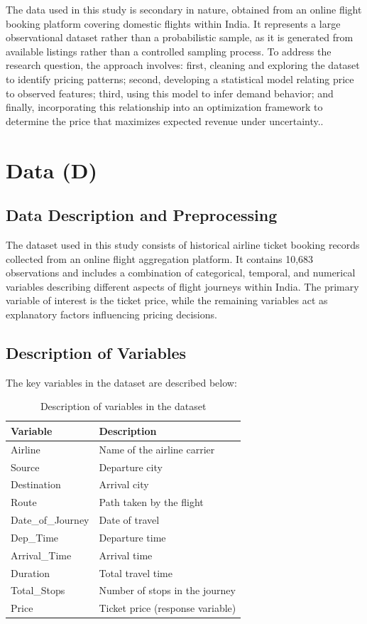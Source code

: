 \documentclass[12pt]{article}
\begin{document}
The data used in this study is secondary in nature, obtained from an online flight booking platform covering domestic flights within India. It represents a large observational dataset rather than a probabilistic sample, as it is generated from available listings rather than a controlled sampling process. To address the research question, the approach involves: first, cleaning and exploring the dataset to identify pricing patterns; second, developing a statistical model relating price to observed features; third, using this model to infer demand behavior; and finally, incorporating this relationship into an optimization framework to determine the price that maximizes expected revenue under uncertainty..

\section{Data (D)}
\subsection{Data Description and Preprocessing}

The dataset used in this study consists of historical airline ticket booking records collected from an online flight aggregation platform. It contains 10,683 observations and includes a combination of categorical, temporal, and numerical variables describing different aspects of flight journeys within India. The primary variable of interest is the ticket price, while the remaining variables act as explanatory factors influencing pricing decisions.

\subsection{Description of Variables}

The key variables in the dataset are described below:

\begin{table}[h!]
\centering
\begin{tabular}{|l|l|}
\hline
Variable & Description \\
\hline
Airline & Name of the airline carrier \\
Source & Departure city \\
Destination & Arrival city \\
Route & Path taken by the flight \\
Date\_of\_Journey & Date of travel \\
Dep\_Time & Departure time \\
Arrival\_Time & Arrival time \\
Duration & Total travel time \\
Total\_Stops & Number of stops in the journey \\
Price & Ticket price (response variable) \\
\hline
\end{tabular}
\caption{Description of variables in the dataset}
\end{table}
\end{document}
